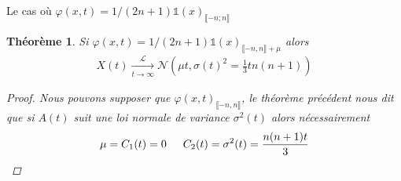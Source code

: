 \documentclass{article}
\newtheorem{theorem}{Théorème}[section]
\theoremstyle{definition}
\begin{document}
\begin{section}{Le cas où $\varphi(x, t) = 1/(2n+1)\mathds{1}(x)_{\llbracket -n; n\rrbracket}$}
%
%
%
%
%
%
%
\begin{theorem}
	Si $\varphi(x,t) = 1/(2n+1)\mathds{1}(x)_{\llbracket -n,n\rrbracket+\mu}$ alors
	\begin{align*}
		X(t) \underset{t\to \infty}{\overset{\mathcal{L}}{\to}} \mathcal{N}(\mu t, \sigma(t)^2 = \frac{1}{3}tn(n+1))
	\end{align*}
	\begin{proof}
		Nous pouvons supposer que $\varphi(x,t)_{\llbracket -n,n\rrbracket}$, le théorème précédent nous dit que si $A(t)$ suit une loi normale de variance $\sigma^2(t)$ alors nécessairement 
	\begin{align*}
		\mu = C_1(t) = 0 \indent C_2(t) = \sigma^2(t)  = \frac{n(n+1)t}{3}
	\end{align*}


\end{proof}
\end{theorem}
\end{section}
\end{document}
